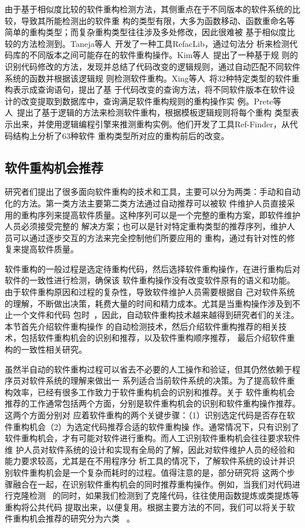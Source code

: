由于基于相似度比较的软件重构检测方法，其侧重点在于不同版本的软件系统的比较，导致其所能检测出的软件重
构的类型有限，大多为函数移动、函数重命名等简单的重构类型；而复杂重构类型往往涉及多处修改，因此很难被
基于相似度比较的方法检测到。Taneja等人~\cite{taneja2007automated}开发了一种工具RefacLib，通过句法分
析来检测代码库的不同版本之间可能存在的软件重构操作。Kim等人~\cite{kim2007automatic}提出了一种基于规
则的识别代码修改的方法，发现并总结了代码改变的逻辑规则，通过自动匹配不同软件系统的函数并根据该逻辑规
则检测软件重构。Xing等人~\cite{xing2006refactoring}将32种特定类型的软件重构表示成查询语句，提出了基
于代码改变的查询方法，将不同软件版本在软件设计的改变提取到数据库中，查询满足软件重构规则的重构操作实
例。Prete等人~\cite{prete2010template}提出了基于逻辑的方法来检测软件重构，根据模板逻辑规则将每个重构
类型表示出来，并使用逻辑编程引擎来推测重构实例。他们开发了工具Ref-Finder，从代码结构上分析了63种软件
重构类型所对应的重构前后的改变。


\subsection{软件重构机会推荐}

研究者们提出了很多面向软件重构的技术和工具，主要可以分为两类：手动和自动化的方法。第一类方法主要第二类方法通过自动推荐可以被软
件维护人员直接采用的重构序列来提高软件质量\cite{harman2007pareto, kessentini2011design,
ouni2013maintainability, Silva2014}。这种序列可以是一个完整的重构方案，即软件维护人员必须接受完整的
解决方案；也可以是针对特定重构类型的推荐序列，维护人员可以通过逐步交互的方法来完全控制他们所要应用的
重构，通过有针对性的修复来提高软件质量。

软件重构的一般过程是选定待重构代码，然后选择软件重构操作，在进行重构后对软件的一致性进行检测，确保该
软件重构操作没有改变软件原有的语义和功能。由于软件重构原因和过程的复杂性，导致软件维护人员需要根据自
己对软件系统的理解，不断做出决策，耗费大量的时间和精力成本。尤其是当重构操作涉及到不止一个文件和代码
包时~\cite{liu2013monitor}，因此，自动软件重构技术越来越得到研究者们的关注。本节首先介绍软件重构操作
的自动检测技术，然后介绍软件重构推荐的相关技术，包括软件重构机会的识别和推荐，以及软件重构顺序推荐，
最后介绍软件重构的一致性相关研究。


虽然半自动的软件重构过程可以省去不必要的人工操作和验证，但其仍然依赖于程序员对软件系统的理解来做出一
系列适合当前软件系统的决策。为了提高软件重构效率，已经有很多工作致力于软件重构机会的识别和推荐。关于
软件重构机会推荐的工作通常包括两个方面，分别是软件重构机会的识别和软件重构操作推荐。这两个方面分别对
应着软件重构的两个关键步骤：（1）识别选定代码是否存在软件重构机会（2）为选定代码推荐合适的软件重构操
作。通常情况下，只有识别了软件重构机会，才有可能对软件进行重构。而人工识别软件重构机会往往要求软件维
护人员对软件系统的设计和实现有全局的了解，因此对软件维护人员的经验和能力要求较高，尤其是在不用程序分
析工具的情况下，了解软件系统的设计并识别软件重构机会是一个复杂而耗时的过程。值得注意的是，部分研究将
这两个步骤融合在一起，在识别软件重构机会的同时推荐重构操作。例如，当我们对代码进行克隆检测
~\cite{kamiya2002ccfinder}的同时，如果我们检测到了克隆代码，往往使用函数提炼或类提炼等重构将公共代码
提取出来，以便复用。根据主要方法的不同，我们可以将关于软件重构机会推荐的研究分为六类
~\cite{al2015identifying}。

